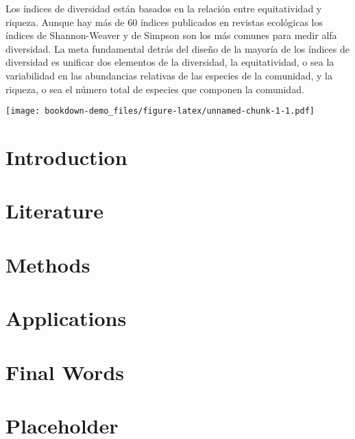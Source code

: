 \documentclass[]{book}
\begin{document}
Los índices de diversidad están basados en la relación entre
equitatividad y riqueza. Aunque hay más de 60 índices publicados en
revistas ecológicas los índices de Shannon-Weaver y de Simpson son los
más comunes para medir alfa diversidad. La meta fundamental detrás del
diseño de la mayoría de los índices de diversidad es unificar dos
elementos de la diversidad, la equitatividad, o sea la variabilidad en
las abundancias relativas de las especies de la comunidad, y la riqueza,
o sea el número total de especies que componen la comunidad.

\texttt{[image: bookdown-demo\_files/figure-latex/unnamed-chunk-1-1.pdf]}

\chapter{Introduction}\label{intro}

\chapter{Literature}\label{literature}

\chapter{Methods}\label{methods}

\chapter{Applications}\label{applications}

\chapter{Final Words}\label{final-words}

\chapter{Placeholder}\label{placeholder}


\end{document}
